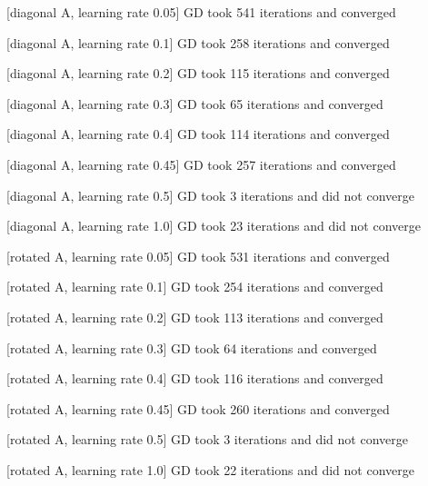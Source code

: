 \begin{answer}

[diagonal A, learning rate 0.05] GD took 541 iterations and converged

[diagonal A, learning rate 0.1] GD took 258 iterations and converged

[diagonal A, learning rate 0.2] GD took 115 iterations and converged

[diagonal A, learning rate 0.3] GD took 65 iterations and converged

[diagonal A, learning rate 0.4] GD took 114 iterations and converged

[diagonal A, learning rate 0.45] GD took 257 iterations and converged

[diagonal A, learning rate 0.5] GD took 3 iterations and did not converge

[diagonal A, learning rate 1.0] GD took 23 iterations and did not converge

[rotated A, learning rate 0.05] GD took 531 iterations and converged

[rotated A, learning rate 0.1] GD took 254 iterations and converged

[rotated A, learning rate 0.2] GD took 113 iterations and converged

[rotated A, learning rate 0.3] GD took 64 iterations and converged

[rotated A, learning rate 0.4] GD took 116 iterations and converged

[rotated A, learning rate 0.45] GD took 260 iterations and converged

[rotated A, learning rate 0.5] GD took 3 iterations and did not converge

[rotated A, learning rate 1.0] GD took 22 iterations and did not converge

\end{answer}